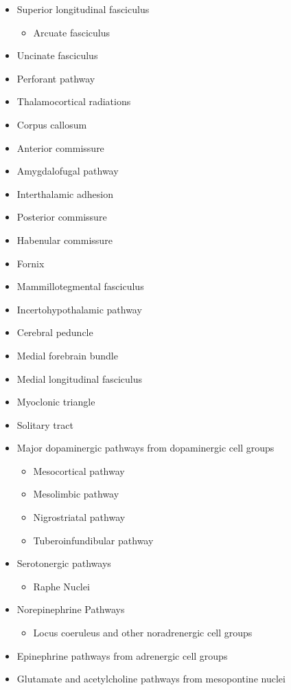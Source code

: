 \begin{itemize}
\tightlist
\item
  Superior longitudinal fasciculus

  \begin{itemize}
  \tightlist
  \item
    Arcuate fasciculus
  \end{itemize}
\item
  Uncinate fasciculus
\item
  Perforant pathway
\item
  Thalamocortical radiations
\item
  Corpus callosum
\item
  Anterior commissure
\item
  Amygdalofugal pathway
\item
  Interthalamic adhesion
\item
  Posterior commissure
\item
  Habenular commissure
\item
  Fornix
\item
  Mammillotegmental fasciculus
\item
  Incertohypothalamic pathway
\item
  Cerebral peduncle
\item
  Medial forebrain bundle
\item
  Medial longitudinal fasciculus
\item
  Myoclonic triangle
\item
  Solitary tract
\item
  Major dopaminergic pathways from dopaminergic cell groups

  \begin{itemize}
  \tightlist
  \item
    Mesocortical pathway
  \item
    Mesolimbic pathway
  \item
    Nigrostriatal pathway
  \item
    Tuberoinfundibular pathway
  \end{itemize}
\item
  Serotonergic pathways

  \begin{itemize}
  \tightlist
  \item
    Raphe Nuclei
  \end{itemize}
\item
  Norepinephrine Pathways

  \begin{itemize}
  \tightlist
  \item
    Locus coeruleus and other noradrenergic cell groups
  \end{itemize}
\item
  Epinephrine pathways from adrenergic cell groups
\item
  Glutamate and acetylcholine pathways from mesopontine nuclei
\end{itemize}

